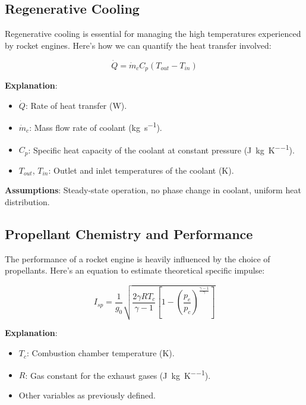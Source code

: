 \documentclass[12pt]{report}
\begin{document}
\subsection{Regenerative Cooling}
Regenerative cooling is essential for managing the high temperatures experienced by rocket engines. Here's how we can quantify the heat transfer involved:

\begin{equation}
\dot{Q} = \dot{m}_c C_p (T_{out} - T_{in}) \label{eq:regenerative_cooling}
\end{equation}

\textbf{Explanation}:
\begin{itemize}
    \item $\dot{Q}$: Rate of heat transfer (\si{\watt}).
    \item $\dot{m}_c$: Mass flow rate of coolant (\si{\kilogram\per\second}).
    \item $C_p$: Specific heat capacity of the coolant at constant pressure (\si{\joule\per\kilogram\per\kelvin}).
    \item $T_{out}$, $T_{in}$: Outlet and inlet temperatures of the coolant (\si{\kelvin}).
\end{itemize}

\textbf{Assumptions}: Steady-state operation, no phase change in coolant, uniform heat distribution.

\subsection{Propellant Chemistry and Performance}
The performance of a rocket engine is heavily influenced by the choice of propellants. Here's an equation to estimate theoretical specific impulse:

\begin{equation}
I_{sp} = \frac{1}{g_0} \sqrt{\frac{2\gamma R T_c}{\gamma-1} \left[1 - \left(\frac{p_e}{p_c}\right)^{\frac{\gamma-1}{\gamma}}\right]} \label{eq:theoretical_specific_impulse}
\end{equation}

\textbf{Explanation}:
\begin{itemize}
    \item $T_c$: Combustion chamber temperature (\si{\kelvin}).
    \item $R$: Gas constant for the exhaust gases (\si{\joule\per\kilogram\per\kelvin}).
    \item Other variables as previously defined.
\end{itemize}
\end{document}
